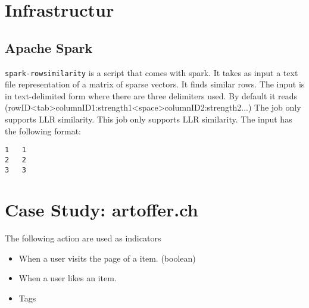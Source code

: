 \documentclass[twoside,a4paper]{article}
\begin{document}
\section{Infrastructur}
\label{sec:infrastructur}


\subsection{Apache Spark}
\label{sec:spark}
\verb|spark-rowsimilarity| is a script that comes with spark. It takes as input a text file representation of a matrix of sparse vectors. It finds similar rows. The input is in text-delimited form where there are three delimiters used. By default it reads (rowID<tab>columnID1:strength1<space>columnID2:strength2...) The job only supports LLR similarity. This job only supports LLR similarity.
The input has the following format:
\begin{verbatim}
1	1
2	2
3	3 
\end{verbatim}

\section{Case Study: artoffer.ch}
\label{sec:artoffer}

The following action are used as indicators
\begin{itemize}
\item When a user visits the page of a item. (boolean)
\item When a user likes an item.
\item Tags
\end{itemize}


\end{document}
